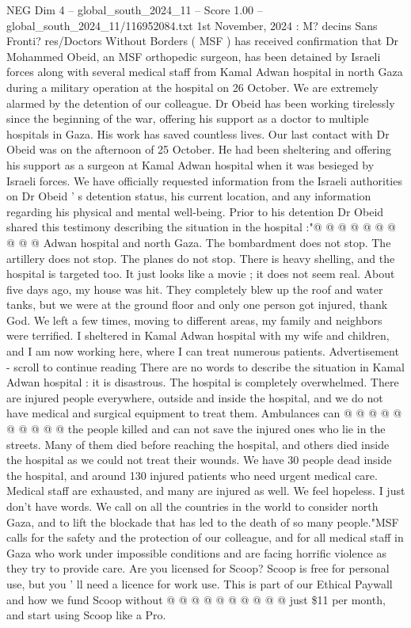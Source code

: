 \begin{textsample}{NEG Dim 4 – global\_south\_2024\_11 – Score 1.00 – global\_south\_2024\_11/116952084.txt}  \label{ex:f4_neg_201}
1st November, 2024 : M? decins Sans Fronti? res/Doctors Without Borders ( MSF ) has received confirmation that Dr Mohammed Obeid, an MSF orthopedic surgeon, has been detained by Israeli forces along with several medical staff from Kamal Adwan hospital in north Gaza during a military operation at the hospital on 26 October.
We are extremely alarmed by the detention of our colleague.
Dr Obeid has been working tirelessly since the beginning of the war, offering his support as a doctor to multiple hospitals in Gaza.
His work has saved countless lives.
Our last contact with Dr Obeid was on the afternoon of 25 October.
He had been sheltering and offering his support as a surgeon at Kamal Adwan hospital when it was besieged by Israeli forces.
We have officially requested information from the Israeli authorities on Dr Obeid ' s detention status, his current location, and any information regarding his physical and mental well-being.
Prior to his detention Dr Obeid shared this testimony describing the situation in the hospital :"@ @ @ @ @ @ @ @ @ @ Adwan hospital and north Gaza.
The bombardment does not stop.
The artillery does not stop.
The planes do not stop.
There is heavy shelling, and the hospital is targeted too.
It just looks like a movie ; it does not seem real.
About five days ago, my house was hit.
They completely blew up the roof and water tanks, but we were at the ground floor and only one person got injured, thank God.
We left a few times, moving to different areas, my family and neighbors were terrified.
I sheltered in Kamal Adwan hospital with my wife and children, and I am now working here, where I can treat numerous patients.
Advertisement - scroll to continue reading There are no words to describe the situation in Kamal Adwan hospital : it is disastrous.
The hospital is completely overwhelmed.
There are injured people everywhere, outside and inside the hospital, and we do not have medical and surgical equipment to treat them.
Ambulances can @ @ @ @ @ @ @ @ @ @ the people killed and can not save the injured ones who lie in the streets.
Many of them died before reaching the hospital, and others died inside the hospital as we could not treat their wounds.
We have 30 people dead inside the hospital, and around 130 injured patients who need urgent medical care.
Medical staff are exhausted, and many are injured as well.
We feel hopeless.
I just don't have words.
We call on all the countries in the world to consider north Gaza, and to lift the blockade that has led to the death of so many people."MSF calls for the safety and the protection of our colleague, and for all medical staff in Gaza who work under impossible conditions and are facing horrific violence as they try to provide care.
Are you licensed for Scoop?
Scoop is free for personal use, but you ' ll need a licence for work use.
This is part of our Ethical Paywall and how we fund Scoop without @ @ @ @ @ @ @ @ @ @ just \$11 per month, and start using Scoop like a Pro.

\end{textsample}
